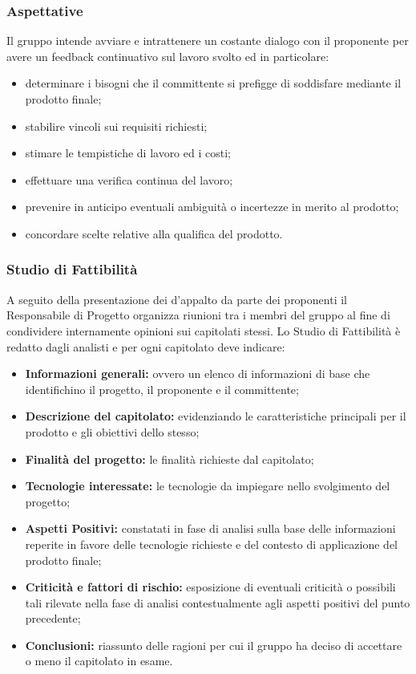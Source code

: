 \subsubsection{Aspettative}
Il gruppo intende avviare e intrattenere un costante dialogo con il proponente per avere un feedback continuativo sul lavoro svolto ed in particolare:
\begin{itemize}
  \item determinare i bisogni che il committente si prefigge di soddisfare mediante il prodotto finale;
  \item stabilire vincoli sui requisiti richiesti;
  \item stimare le tempistiche di lavoro ed i costi;
  \item effettuare una verifica continua del lavoro;
  \item prevenire in anticipo eventuali ambiguità o incertezze in merito al prodotto;
  \item concordare scelte relative alla qualifica del prodotto.
\end{itemize}

\subsubsection{Studio di Fattibilità}
\label{_studioDiFattibilita}
A seguito della presentazione dei  d'appalto da parte dei proponenti il Responsabile di Progetto organizza riunioni tra i membri del gruppo al fine di condividere internamente opinioni sui capitolati stessi.
Lo Studio di Fattibilità è redatto dagli analisti e per ogni capitolato deve indicare:
\begin{itemize}
  \item \textbf{Informazioni generali:} ovvero un elenco di informazioni di base che identifichino il progetto, il proponente e il committente;
  \item \textbf{Descrizione del capitolato:}  evidenziando le caratteristiche principali per il prodotto e gli obiettivi dello stesso;
  \item \textbf{Finalità del progetto:} le finalità richieste dal capitolato;
  \item \textbf{Tecnologie interessate:} le tecnologie da impiegare nello svolgimento del progetto;
  \item \textbf{Aspetti Positivi:} constatati in fase di analisi sulla base delle informazioni reperite in favore delle tecnologie richieste e del contesto di applicazione del prodotto finale;
  \item \textbf{Criticità e fattori di rischio:} esposizione di eventuali criticità o possibili tali rilevate nella fase di analisi contestualmente agli aspetti positivi del punto precedente;
  \item \textbf{Conclusioni:} riassunto delle ragioni per cui il gruppo ha deciso di accettare o meno il capitolato in esame.
\end{itemize}

